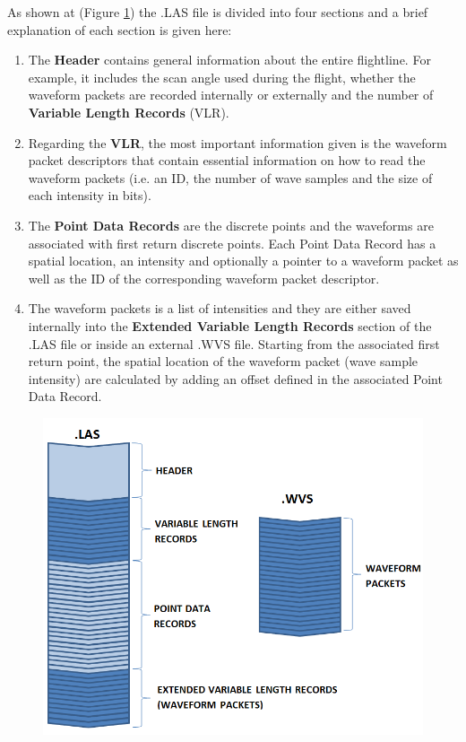 \documentclass{subfiles}
\begin{document}
    \par As shown at (Figure \ref{fig:LAS1_3_fileFormat}) the .LAS file is divided into four sections and a brief explanation of each section is given here:
    \begin{enumerate}
    \item  The \textbf{Header} contains general information about the entire flightline. For example, it includes the scan angle used during the flight, whether the waveform packets are recorded internally or externally  and the number of \textbf{Variable Length Records} (VLR). 
    \item Regarding the \textbf{VLR}, the most important information given is the waveform packet descriptors that contain essential information on how to read the waveform packets (i.e. an ID, the number of wave samples and the size of each intensity in bits). 
    \item The \textbf{Point Data Records} are the discrete points and the waveforms are associated with first return discrete points. Each Point Data Record has a spatial location, an intensity and optionally a pointer to a waveform packet as well as the ID of the corresponding waveform packet descriptor. 
    \item The waveform packets is a list of intensities and they are either saved internally into the \textbf{Extended Variable Length Records} section of the .LAS file or inside an external .WVS file. Starting from the associated first return point, the spatial location of the waveform packet (wave sample intensity) are calculated by adding an offset defined in the associated Point Data Record. 
    \end{enumerate}  
    

	 \begin{figure}[!htbp]
           \centering
           \includegraphics[width=\textwidth/3*2]{img/LAS1_3_fileFormat}
           \caption[Airborne LiDAR system]{}
           \label{fig:LAS1_3_fileFormat}
      \end{figure}
\end{document}

